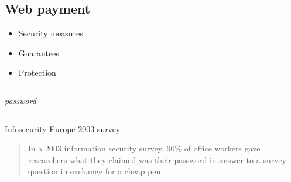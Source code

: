 \subsection{Web payment}

\begin{frame}
\begin{center}
\begin{minipage}{0.5\linewidth} %
\begin{itemize}
\item Security measures
\item Guarantees
\item Protection
\end{itemize}
\end{minipage}
\end{center}
\end{frame}

\begin{frame}
\begin{columns}
\begin{column}{0.4\linewidth}
\Large
\centering
\emph{password}
\end{column}
\begin{column}{0.2\linewidth}
\end{column}
\begin{column}{0.4\linewidth}
\end{column}
\pause
\end{columns}
\begin{exampleblock}{Infosecurity Europe 2003 survey}
\begin{quote}
\small{In a 2003 information security survey, {\Large 90\%} of office workers gave
researchers what they claimed was their {\Large password} in answer to a
survey question in exchange for a {\Large cheap pen}.}
\end{quote}
\end{exampleblock}
\end{frame}


